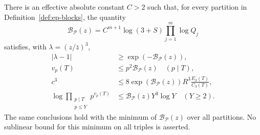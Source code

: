 \begin{theorem}
\label{thm:ep-main}
There is an effective absolute constant $C>2$ such that, for every partition
in Definition~\ref{def:ep-blocks}, the quantity
\begin{equation}\label{eq:ep-penalty}
 \mathcal B_{\mathcal P}(z)=C^{m+1}\log(3+S)\prod_{j=1}^m\log Q_j
\end{equation}
satisfies, with $\lambda=(z/\bar z)^3$,
\begin{align}
 |\lambda-1|&\ge\exp(-\mathcal B_{\mathcal P}(z)),\label{eq:ep-angle}\\
 v_p(T)&\le p^2\mathcal B_{\mathcal P}(z)\quad(p\mid T),\label{eq:ep-adic}\\
 c^3&\le8\exp(\mathcal B_{\mathcal P}(z))R^3
 \frac{E_3(T)}{C_3(T)},\label{eq:ep-height}\\
 \log\prod_{\substack{p\mid T\\p\le Y}}p^{v_p(T)}
 &\le\mathcal B_{\mathcal P}(z)Y^3\log Y\quad(Y\ge2).
 \label{eq:ep-small}
\end{align}
The same conclusions hold with the minimum of
$\mathcal B_{\mathcal P}(z)$ over all partitions. No sublinear bound for this
minimum on all triples is asserted.
\end{theorem}
